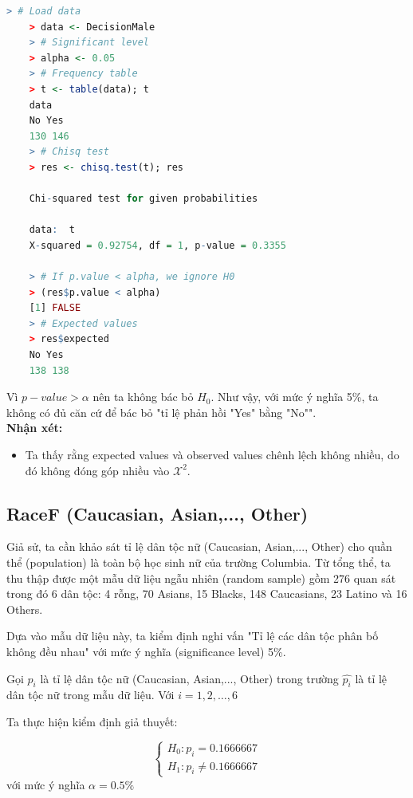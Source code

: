 \documentclass[a4paper,12pt]{article}
\begin{document}
	\begin{lstlisting}[language=R]
	> # Load data
	> data <- DecisionMale
	> # Significant level
	> alpha <- 0.05
	> # Frequency table
	> t <- table(data); t
	data
	No Yes 
	130 146 
	> # Chisq test
	> res <- chisq.test(t); res
	
	Chi-squared test for given probabilities
	
	data:  t
	X-squared = 0.92754, df = 1, p-value = 0.3355
	
	> # If p.value < alpha, we ignore H0
	> (res$p.value < alpha)
	[1] FALSE
	> # Expected values
	> res$expected
	No Yes 
	138 138
	\end{lstlisting}
	
	Vì $p-value > \alpha$ nên ta không bác bỏ $H_0$. Như vậy, với mức ý nghĩa 5\%, ta không có đủ căn cứ để bác bỏ "tỉ lệ phản hồi "Yes" bằng "No"".\\
	
	\textbf{Nhận xét:}\\
	\begin{itemize}
		\item Ta thấy rằng expected values và observed values chênh lệch không nhiều, do đó không đóng góp nhiều vào $\mathcal{X}^2$.
	\end{itemize}
	
	
	
	\subsection{RaceF (Caucasian, Asian,..., Other)}
	
	Giả sử, ta cần khảo sát tỉ lệ dân tộc nữ (Caucasian, Asian,..., Other) cho quần thể (population) là toàn bộ học sinh nữ của trường Columbia. Từ tổng thể, ta thu thập được một mẫu dữ liệu ngẫu nhiên (random sample) gồm 276 quan sát trong đó 6 dân tộc: 4 rỗng, 70 Asians, 15 Blacks, 148 Caucasians, 23 Latino và 16 Others. 
	
	Dựa vào mẫu dữ liệu này, ta kiểm định nghi vấn "Tỉ lệ các dân tộc phân bố không đều nhau" với mức ý nghĩa (significance level) 5\%.
	
	Gọi $p_i$ là tỉ lệ dân tộc nữ (Caucasian, Asian,..., Other) trong trường $\hat{p_i}$ là tỉ lệ dân tộc nữ trong mẫu dữ liệu. Với $i = 1, 2, \dots, 6$
	
	Ta thực hiện kiểm định giả thuyết:
	
	\begin{equation*}
	\begin{cases}
	H_0: p_i = 0.1666667\\
	H_1: p_i \neq 0.1666667
	\end{cases}
	\end{equation*}
	với mức ý nghĩa $\alpha = 0.5\%$
	
\end{document}
